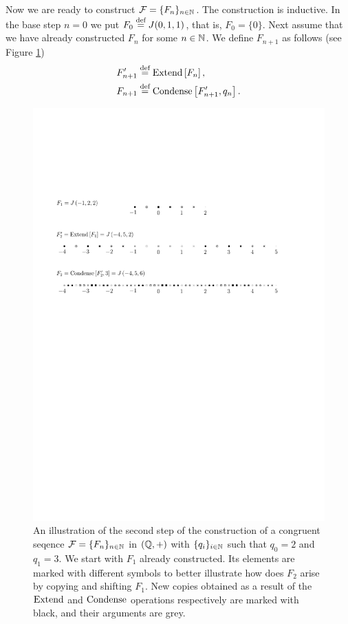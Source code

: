 Now we are ready to construct $\operatorname{\mathcal{F}}=\{F_n\}_{n\in\mathbb{N}}$. The construction is inductive. 
%
In the base step $n=0$ we put $F_0\stackrel{\textup{def}}{=} J(0,1,1)$, that is, $F_0=\{0\}.$ 
%
Next assume that we have already constructed $F_n$ for some $n\in\mathbb{N}$. 
%
We define $F_{n+1}$ as follows (see Figure \ref{fig:folner_in_Q})
\begin{align*}
&F_{n+1}'\stackrel{\textup{def}}{=} \operatorname{Extend} \left[F_n\right], \\
&F_{n+1} \stackrel{\textup{def}}{=} \operatorname{Condense} \left[ F_{n+1}', q_{n}\right].
\end{align*}

\begin{figure}
\centering
\includegraphics[scale=0.9]{../Graphics/folnerQ}
\caption{An illustration of the second step of the construction of a congruent \Folner seqence $\operatorname{\mathcal{F}}=\{F_n\}_{n\in\mathbb{N}}$ in $(\mathbb{Q},+)$ with $\{q_i\}_{i\in\mathbb{N}}$ such that $q_0=2$ and $q_1=3$. We start with $F_1$ already constructed. Its elements are marked with different symbols to better illustrate how does $F_2$ arise by copying and shifting $F_1$. New copies obtained as a result of the  $\operatorname{Extend}$ and $\operatorname{Condense}$ operations respectively are marked with black, and their arguments are grey.}\label{fig:folner_in_Q}
\end{figure}

